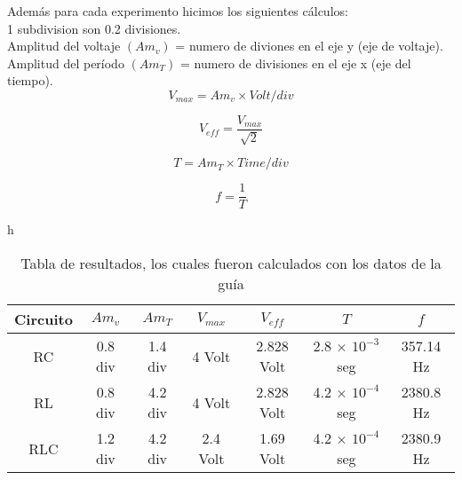 \documentclass[]{article}
\begin{document}
Además para cada experimento hicimos los siguientes cálculos:\\
1 subdivision son 0.2 divisiones.\\
Amplitud del voltaje $(Am_v)$ = numero de diviones en el eje y (eje de voltaje).\\
Amplitud del período $(Am_T)$ = numero de divisiones en el eje x (eje del tiempo).\\ 
\begin{equation}\label{voltaje_max}
V_{max} = Am_v \times Volt/div 
\end{equation}

\begin{equation}\label{voltaje_eff}
V_{eff} = \dfrac{V_{max}}{\sqrt{2}}
\end{equation}

\begin{equation}\label{T_periodo}
T = Am_T \times Time/div 
\end{equation}

\begin{equation}\label{frecuencia}
f = \dfrac{1}{T}
\end{equation}

\begin{table}{h}
	\begin{center}
		\begin{tabular}{| c | c | c | c | c | c | c |}
			Circuito & $Am_v$ & $Am_T$ & $V_{max}$ & $V_{eff}$ & $T$ & $f$ \\ \hline
			RC & 0.8 div & 1.4 div & 4 Volt & 2.828 Volt & 2.8 $\times$ $10^{-3}$ seg & 357.14 Hz \\
			RL & 0.8 div & 4.2 div & 4 Volt & 2.828 Volt & 4.2 $\times$ $10^{-4}$ seg & 2380.8 Hz  \\
			RLC & 1.2 div & 4.2 div & 2.4 Volt & 1.69 Volt & 4.2 $\times$ $10^{-4}$ seg   & 2380.9 Hz   \\ \hline
		\end{tabular}
		\caption{Tabla de resultados, los cuales fueron calculados con los datos de la guía}
		\label{Tabla}
	\end{center}
\end{table} 
\end{document}
